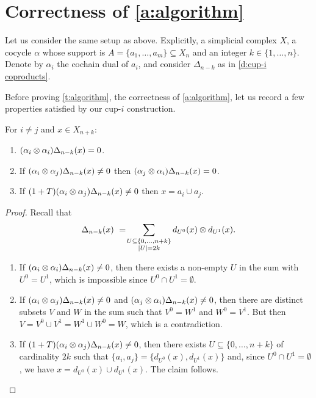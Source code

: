 
\section{Correctness of \texorpdfstring{\cref{a:algorithm}}{Algorithm 1}} \label{s:correctness}

Let us consider the same setup as above. Explicitly, a simplicial complex $X$, a cocycle $\alpha$ whose support is $A = \{a_1, \dots, a_m\} \subseteq X_n$ and an integer $k \in \{1, \dots, n\}$.
Denote by $\alpha_i$ the cochain dual of $a_i$, and consider
$\Delta_{n-k}$ as in \cref{d:cup-i coproducts}.

Before proving \cref{t:algorithm}, the correctness of \cref{a:algorithm}, let us record a few properties satisfied by our cup-$i$ construction.

\begin{lemma} \label{l:freeness}
	For $i \neq j$ and $x \in X_{n+k}$:
	\begin{enumerate}
		\item $(\alpha_i \otimes \alpha_i)\Delta_{n-k}(x) = 0$.
		\item If $(\alpha_i \otimes \alpha_j)\Delta_{n-k}(x) \neq 0$ then $(\alpha_j \otimes \alpha_i)\Delta_{n-k}(x) = 0$.
		\item If $(1+T)(\alpha_i \otimes \alpha_j)\Delta_{n-k}(x) \neq 0$ then $x = a_i \cup a_j$.
	\end{enumerate}
\end{lemma}

\begin{proof}
	Recall that
	\begin{equation*}
	\Delta_{n-k}(x) \ = \! \sum_{\substack{U \subseteq \{0, \dots, n+k\} \\ \vert U \vert = 2k}}
	d_{U^0}(x) \otimes d_{U^1}(x).
	\end{equation*}

	\begin{enumerate}
		\item If $(\alpha_i \otimes \alpha_i)\Delta_{n-k}(x) \neq 0$, then there exists a non-empty $U$ in the sum with $U^0 = U^1$, which is impossible since $U^0 \cap U^1 = \emptyset$.

		\item If $(\alpha_i \otimes \alpha_j)\Delta_{n-k}(x) \neq 0$ and $(\alpha_j \otimes \alpha_i)\Delta_{n-k}(x) \neq 0$, then there are distinct subsets $V$ and $W$ in the sum such that $V^0 = W^1$ and $W^0 = V^1$.
		But then $V = V^0 \cup V^1 = W^1 \cup W^0 = W$, which is a contradiction.

		\item If $(1+T)(\alpha_i \otimes \alpha_j)\Delta_{n-k}(x) \neq 0$, then there exists $U \subseteq \{0, \dots, n+k\}$ of cardinality $2k$ such that $\{a_i, a_j\} = \{d_{U^0}(x), d_{U^1}(x)\}$ and, since $U^0 \cap U^1 = \emptyset$, we have $x = d_{U^0}(x) \cup d_{U^1}(x)$.
		The claim follows.
	\end{enumerate}
\end{proof}


